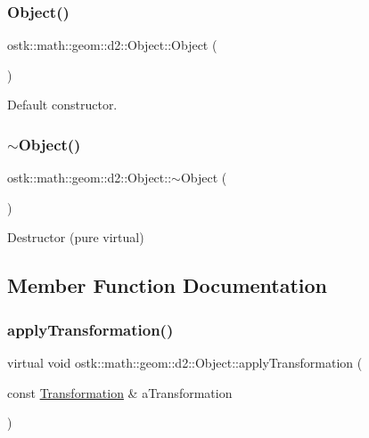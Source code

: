 \subsubsection{\texorpdfstring{Object()}{Object()}}
{\footnotesize\ttfamily ostk\+::math\+::geom\+::d2\+::\+Object\+::\+Object (\begin{DoxyParamCaption}{ }\end{DoxyParamCaption})\hspace{0.3cm}{\ttfamily [default]}}



Default constructor. 

\mbox{\label{classostk_1_1math_1_1geom_1_1d2_1_1_object_a661d5d407b327b22d3139884a93eebf9}} 
\subsubsection{\texorpdfstring{$\sim$\+Object()}{~Object()}}
{\footnotesize\ttfamily ostk\+::math\+::geom\+::d2\+::\+Object\+::$\sim$\+Object (\begin{DoxyParamCaption}{ }\end{DoxyParamCaption})\hspace{0.3cm}{\ttfamily [pure virtual]}}



Destructor (pure virtual) 



\subsection{Member Function Documentation}
\mbox{\label{classostk_1_1math_1_1geom_1_1d2_1_1_object_a959e50211d7a680f7f904bbb752d75c9}} 
\subsubsection{\texorpdfstring{apply\+Transformation()}{applyTransformation()}}
{\footnotesize\ttfamily virtual void ostk\+::math\+::geom\+::d2\+::\+Object\+::apply\+Transformation (\begin{DoxyParamCaption}\item[{const \hyperlink{classostk_1_1math_1_1geom_1_1d2_1_1_transformation}{Transformation} \&}]{a\+Transformation }\end{DoxyParamCaption})\hspace{0.3cm}{\ttfamily [pure virtual]}}



